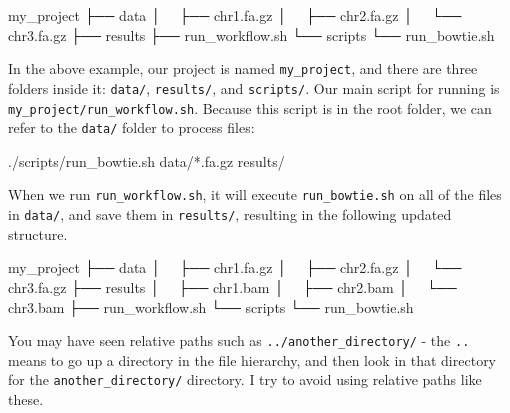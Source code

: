 \documentclass[
  letterpaper,
  DIV=11,
  numbers=noendperiod]{scrreprt}
\newenvironment{Shaded}{\begin{snugshade}}{\end{snugshade}}
\newcommand{\ExtensionTok}[1]{\textcolor[rgb]{0.00,0.23,0.31}{#1}}
\newcommand{\NormalTok}[1]{\textcolor[rgb]{0.00,0.23,0.31}{#1}}
\newcommand{\PreprocessorTok}[1]{\textcolor[rgb]{0.68,0.00,0.00}{#1}}
\begin{document}
\begin{Shaded}
\begin{Highlighting}[]
\ExtensionTok{my\_project}
\ExtensionTok{├──}\NormalTok{ data}
\ExtensionTok{│  }\NormalTok{ ├── chr1.fa.gz}
\ExtensionTok{│  }\NormalTok{ ├── chr2.fa.gz}
\ExtensionTok{│  }\NormalTok{ └── chr3.fa.gz}
\ExtensionTok{├──}\NormalTok{ results}
\ExtensionTok{├──}\NormalTok{ run\_workflow.sh}
\ExtensionTok{└──}\NormalTok{ scripts}
    \ExtensionTok{└──}\NormalTok{ run\_bowtie.sh}
\end{Highlighting}
\end{Shaded}

In the above example, our project is named \texttt{my\_project}, and
there are three folders inside it: \texttt{data/}, \texttt{results/},
and \texttt{scripts/}. Our main script for running is
\texttt{my\_project/run\_workflow.sh}. Because this script is in the
root folder, we can refer to the \texttt{data/} folder to process files:

\begin{Shaded}
\begin{Highlighting}[]
\ExtensionTok{./scripts/run\_bowtie.sh}\NormalTok{ data/}\PreprocessorTok{*}\NormalTok{.fa.gz results/}
\end{Highlighting}
\end{Shaded}

When we run \texttt{run\_workflow.sh}, it will execute
\texttt{run\_bowtie.sh} on all of the files in \texttt{data/}, and save
them in \texttt{results/}, resulting in the following updated structure.

\begin{Shaded}
\begin{Highlighting}[]
\ExtensionTok{my\_project}
\ExtensionTok{├──}\NormalTok{ data}
\ExtensionTok{│  }\NormalTok{ ├── chr1.fa.gz}
\ExtensionTok{│  }\NormalTok{ ├── chr2.fa.gz}
\ExtensionTok{│  }\NormalTok{ └── chr3.fa.gz}
\ExtensionTok{├──}\NormalTok{ results}
\ExtensionTok{│  }\NormalTok{ ├── chr1.bam}
\ExtensionTok{│  }\NormalTok{ ├── chr2.bam}
\ExtensionTok{│  }\NormalTok{ └── chr3.bam}
\ExtensionTok{├──}\NormalTok{ run\_workflow.sh}
\ExtensionTok{└──}\NormalTok{ scripts}
    \ExtensionTok{└──}\NormalTok{ run\_bowtie.sh}
\end{Highlighting}
\end{Shaded}

You may have seen relative paths such as \texttt{../another\_directory/}
- the \texttt{..} means to go up a directory in the file hierarchy, and
then look in that directory for the \texttt{another\_directory/}
directory. I try to avoid using relative paths like these.
\end{document}
